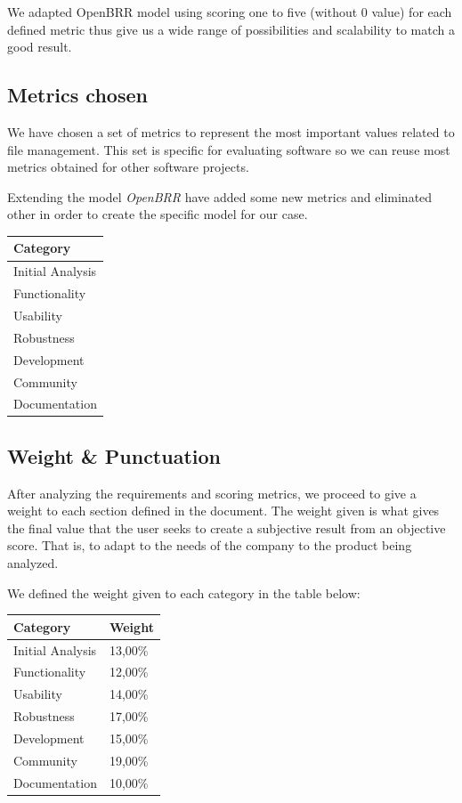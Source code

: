 \documentclass[11pt]{scrartcl}
\begin{document}
\par We adapted OpenBRR model using scoring one to five (without 0 value) for each defined metric thus give us a wide range of possibilities and scalability to match a good result.

\subsection{Metrics chosen}

\par We have chosen a set of metrics to represent the most important values ​​related to file management. This set is specific for evaluating software so we can reuse most metrics obtained for other software projects.

\par Extending the model \emph{OpenBRR} have added some new metrics and eliminated other in order to create the specific model for our case.

\begin{tabular}{|l|}
    \hline {\bf Category}\\
    \hline Initial Analysis\\
    \hline Functionality\\
    \hline Usability\\
    \hline Robustness\\
    \hline Development\\
    \hline Community\\
    \hline Documentation\\
    \hline
\end{tabular}

\subsection{Weight \& Punctuation}

After analyzing the requirements and scoring metrics, we proceed to give a weight to each section defined in the document. The weight given is what gives the final value that the user seeks to create a subjective result from an objective score. That is, to adapt to the needs of the company to the product being analyzed.

We defined the weight given to each category in the table below:

\begin{tabular}{|l|l|}
    \hline Category & Weight\\
    \hline Initial Analysis	 & 13,00\%\\
    \hline Functionality & 12,00\%\\
    \hline Usability & 14,00\%\\
    \hline Robustness & 17,00\%\\
    \hline Development & 15,00\%\\
    \hline Community & 19,00\%\\
    \hline Documentation & 10,00\%\\
    \hline
\end{tabular}
\end{document}
